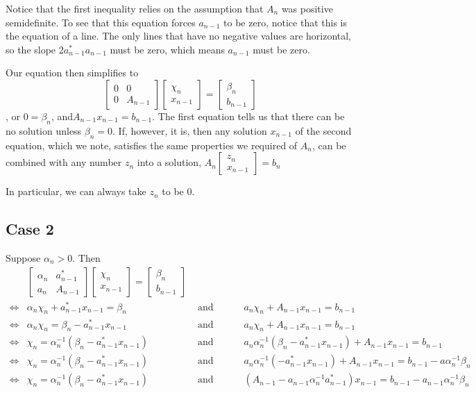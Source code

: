 \documentclass[12pt]{article}
\newcommand{\bmat}[1]{\begin{bmatrix}#1\end{bmatrix}}
\begin{document}
Notice that the first inequality relies on the assumption that $A_n$ was
positive semidefinite. To see that this equation forces $a_{n-1}$ to be zero,
notice that this is the equation of a line. The only lines that have no negative
values are horizontal, so the slope $2a_{n-1}^*a_{n-1}$ must be zero, which means $a_{n-1}$ must
be zero.

Our equation then simplifies to 
$$\bmat{0 & 0 \\ 0 & A_{n-1}}\bmat{\chi_n\\x_{n-1}} =\bmat{\beta_n\\b_{n-1}}$$,
or $0=\beta_n$, and$A_{n-1}x_{n-1}=b_{n-1} $. The first equation tells us that
there can be no solution unless $\beta_n=0$. If, however, it is, then any
solution $x_{n-1}$ of the second equation, which we note, satisfies the same
properties we required of $A_n$, can be combined with any number $z_n$ into a
solution, $A_n\bmat{z_n\\x_{n-1}} = b_n$


In particular, we can always take $z_n$ to be 0.

\subsection{Case 2}
Suppose $\alpha_n>0$. Then
\begin{align*}
&\bmat{\alpha_n & a_{n-1}^* \\ a_n & A_{n-1}}\bmat{\chi_n\\x_{n-1}}=\bmat{\beta_n\\b_{n-1}}
\\\iff&
\alpha_n\chi_n + a_{n-1}^*x_{n-1} = \beta_n &\text{ and }\hspace{2em}&
a_n\chi_n + A_{n-1}x_{n-1} = b_{n-1}
\\\iff&
\alpha_n\chi_n= \beta_n - a_{n-1}^*x_{n-1}  &\text{ and }\hspace{2em}&
a_n\chi_n + A_{n-1}x_{n-1} = b_{n-1}
\\\iff&
\chi_n= \alpha_n^{-1}(\beta_n - a_{n-1}^*x_{n-1}) &\text{ and }\hspace{2em}&
a_n\alpha_n^{-1}(\beta_n - a_{n-1}^*x_{n-1}) + A_{n-1}x_{n-1} = b_{n-1}
\\\iff&
\chi_n= \alpha_n^{-1}(\beta_n - a_{n-1}^*x_{n-1}) &\text{ and }\hspace{2em}&
a_n\alpha_n^{-1}(- a_{n-1}^*x_{n-1}) + A_{n-1}x_{n-1} = b_{n-1}-a\alpha_n^{-1}\beta_n
\\\iff&
\chi_n= \alpha_n^{-1}(\beta_n - a_{n-1}^*x_{n-1}) &\text{ and }\hspace{2em}&
(A_{n-1} - a_{n-1}\alpha_n^{-1}a_{n-1}^*)x_{n-1} = b_{n-1}-a_{n-1}\alpha_n^{-1}\beta_n
\end{align*}
\end{document}
